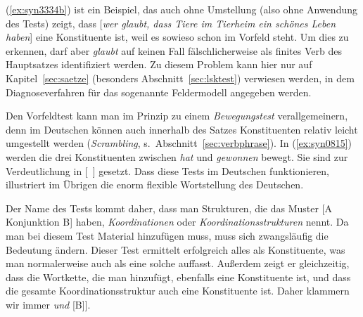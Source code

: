 (\ref{ex:syn3334b}) ist ein Beispiel, das auch ohne Umstellung (also ohne Anwendung des Tests) zeigt, dass [\textit{wer glaubt, dass Tiere im Tierheim ein schönes Leben haben}] eine Konstituente ist, weil es sowieso schon im Vorfeld steht.
Um dies zu erkennen, darf aber \textit{glaubt} auf keinen Fall fälschlicherweise als finites Verb des Hauptsatzes identifiziert werden.
Zu diesem Problem kann hier nur auf Kapitel~\ref{sec:saetze} (besonders Abschnitt~\ref{sec:lsktest}) verwiesen werden, in dem Diagnoseverfahren für das sogenannte Feldermodell angegeben werden.

Den Vorfeldtest kann man im Prinzip zu einem \textit{Bewegungstest} verallgemeinern, denn im Deutschen können auch innerhalb des Satzes Konstituenten relativ leicht umgestellt werden (\textit{Scrambling}, s.\ Abschnitt~\ref{sec:verbphrase}).
In (\ref{ex:syn0815}) werden die drei Konstituenten zwischen \textit{hat} und \textit{gewonnen} bewegt.
Sie sind zur Verdeutlichung in [~] gesetzt.
Dass diese Tests im Deutschen funktionieren, illustriert im Übrigen die enorm flexible Wortstellung des Deutschen.

\begin{exe}
  \ex\label{ex:syn0815}
  \begin{xlist}
  \end{xlist}
\end{exe}


Der Name des Tests kommt daher, dass man Strukturen, die das Muster [A Konjunktion B] haben, \textit{Koordinationen} oder \textit{Koordinationsstrukturen} nennt.
Da man bei diesem Test Material hinzufügen muss, muss sich zwangsläufig die Bedeutung ändern.
Dieser Test ermittelt erfolgreich alles als Konstituente, was man normalerweise auch als eine solche auffasst.
Außerdem zeigt er gleichzeitig, dass die Wortkette, die man hinzufügt, ebenfalls eine Konstituente ist, und dass die gesamte Koordinationsstruktur auch eine Konstituente ist.
Daher klammern wir immer \zB [[A] \textit{und} [B]].

